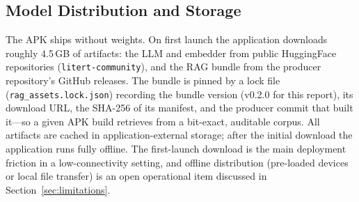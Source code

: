 \subsection{Model Distribution and Storage}

The APK ships without weights. On first launch the application downloads
roughly 4.5\,GB of artifacts: the LLM and embedder from public
HuggingFace repositories (\texttt{litert-community}), and the RAG bundle
from the producer repository's GitHub releases. The bundle is pinned by
a lock file (\texttt{rag\_assets.lock.json}) recording the bundle
version (v0.2.0 for this report), its download URL, the SHA-256 of its
manifest, and the producer commit that built it---so a given APK build
retrieves from a bit-exact, auditable corpus. All artifacts are cached
in application-external storage; after the initial download the
application runs fully offline. The first-launch download is the main
deployment friction in a low-connectivity setting, and
offline distribution (pre-loaded devices or local file transfer) is an
open operational item discussed in Section~\ref{sec:limitations}.

